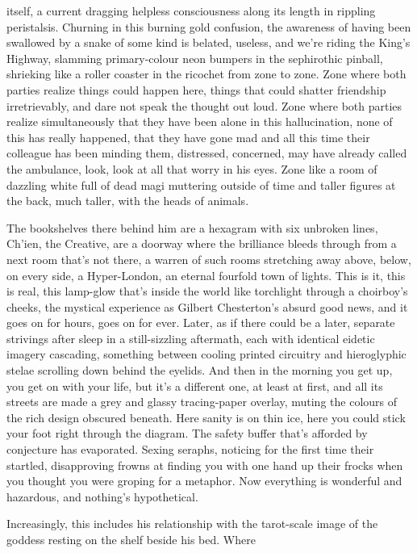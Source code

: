 \documentclass[
]{article}
\begin{document}
itself, a current dragging helpless consciousness along its length in
rippling peristalsis. Churning in this burning gold confusion, the
awareness of having been swallowed by a snake of some kind is belated,
useless, and we're riding the King's Highway, slamming primary-colour
neon bumpers in the sephirothic pinball, shrieking like a roller coaster
in the ricochet from zone to zone. Zone where both parties realize
things could happen here, things that could shatter friendship
irretrievably, and dare not speak the thought out loud. Zone where both
parties realize simultaneously that they have been alone in this
hallucination, none of this has really happened, that they have gone mad
and all this time their colleague has been minding them, distressed,
concerned, may have already called the ambulance, look, look at all that
worry in his eyes. Zone like a room of dazzling white full of dead magi
muttering outside of time and taller figures at the back, much taller,
with the heads of animals. \par
The bookshelves there behind him are a hexagram with six unbroken
lines, Ch'ien, the Creative, are a doorway where the brilliance bleeds
through from a next room that's not there, a warren of such rooms
stretching away above, below, on every side, a Hyper-London, an eternal
fourfold town of lights. This is it, this is real, this lamp-glow that's
inside the world like torchlight through a choirboy's cheeks, the
mystical experience as Gilbert Chesterton's absurd good news, and it
goes on for hours, goes on for ever. Later, as if there could be a
later, separate strivings after sleep in a still-sizzling aftermath,
each with identical eidetic imagery cascading, something between cooling
printed circuitry and hieroglyphic stelae scrolling down behind the
eyelids. And then in the morning you get up, you get on with your life,
but it's a different one, at least at first, and all its streets are
made a grey and glassy tracing-paper overlay, muting the colours of the
rich design obscured beneath. Here sanity is on thin ice, here you could
stick your foot right through the diagram. The safety buffer that's
afforded by conjecture has evaporated. Sexing seraphs, noticing for the
first time their startled, disapproving frowns at finding you with one
hand up their frocks when you thought you were groping for a metaphor.
Now everything is wonderful and hazardous, and nothing's hypothetical. \par
Increasingly, this includes his relationship with the tarot-scale
image of the goddess resting on the shelf beside his bed. Where
\end{document}
